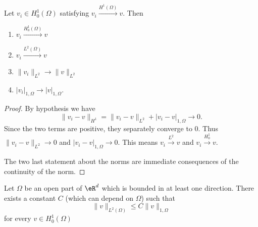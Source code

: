 \begin{lemma}       \label{LEMooEVQKooYoZmbH}
    Let \( v_i\in H_0^1(\Omega)\) satisfying \( v_i\stackrel{H^1(\Omega)}{\longrightarrow}v\). Then
    \begin{enumerate}
        \item
            \( v_i\stackrel{H_0^1(\Omega)}{\longrightarrow}v\)
        \item
            \( v_i\stackrel{L^2(\Omega)}{\longrightarrow}v\)
        \item
            \( \| v_i \|_{L^2}\to \| v \|_{L^2}\)
        \item
            \( | v_i |_{1,\Omega}\to | v |_{1,\Omega}\).
    \end{enumerate}
\end{lemma}

\begin{proof}
    By hypothesis we have
    \begin{equation}
        \| v_i-v \|_{H^1}=\| v_i-v \|_{L^2}+| v_i-v |_{1,\Omega}\to 0.
    \end{equation}
    Since the two terms are positive, they separately converge to \( 0\). Thus \( \| v_i-v \|_{L^2}\to 0\) and \( | v_i-v |_{1,\Omega}\to 0\). This means \( v_i\stackrel{L^2}{\longrightarrow}v\) and \( v_i\stackrel{H_0^1}{\longrightarrow}v\).

    The two last statement about the norms are immediate consequences of the continuity of the norm.
\end{proof}

\begin{theorem}        \label{THOooMIHQooYShOps}
    Let \( \Omega\) be an open part of \( \eR^d\) which is bounded in at least one direction. There exists a constant \( C\) (which can depend on \( \Omega\)) such that
    \begin{equation}
        \| v \|_{L^2(\Omega)}\leq C\| v \|_{1,\Omega}
    \end{equation}
    for every \( v\in H_0^1(\Omega)\)
\end{theorem}


